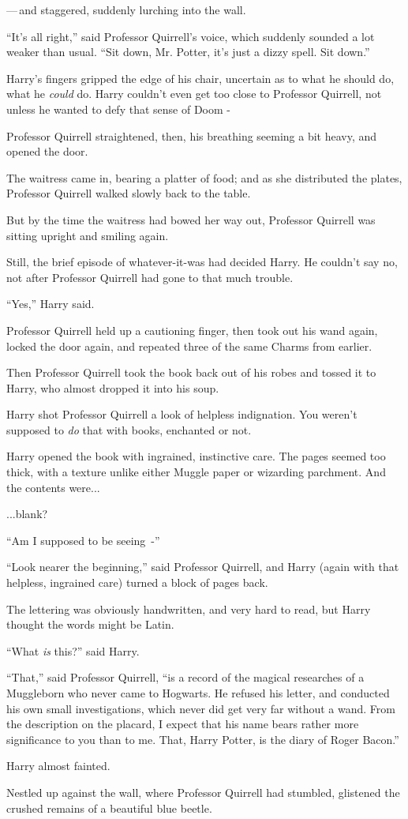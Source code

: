 ---\,and staggered, suddenly lurching into the wall.

``It's all right,'' said Professor Quirrell's voice, which suddenly sounded a lot weaker than usual. ``Sit down, Mr. Potter, it's just a dizzy spell. Sit down.''

Harry's fingers gripped the edge of his chair, uncertain as to what he should do, what he \emph{could} do. Harry couldn't even get too close to Professor Quirrell, not unless he wanted to defy that sense of Doom -

Professor Quirrell straightened, then, his breathing seeming a bit heavy, and opened the door.

The waitress came in, bearing a platter of food; and as she distributed the plates, Professor Quirrell walked slowly back to the table.

But by the time the waitress had bowed her way out, Professor Quirrell was sitting upright and smiling again.

Still, the brief episode of whatever-it-was had decided Harry. He couldn't say no, not after Professor Quirrell had gone to that much trouble.

``Yes,'' Harry said.

Professor Quirrell held up a cautioning finger, then took out his wand again, locked the door again, and repeated three of the same Charms from earlier.

Then Professor Quirrell took the book back out of his robes and tossed it to Harry, who almost dropped it into his soup.

Harry shot Professor Quirrell a look of helpless indignation. You weren't supposed to \emph{do} that with books, enchanted or not.

Harry opened the book with ingrained, instinctive care. The pages seemed too thick, with a texture unlike either Muggle paper or wizarding parchment. And the contents were...

...blank?

``Am I supposed to be seeing~-''

``Look nearer the beginning,'' said Professor Quirrell, and Harry (again with that helpless, ingrained care) turned a block of pages back.

The lettering was obviously handwritten, and very hard to read, but Harry thought the words might be Latin.

``What \emph{is} this?'' said Harry.

``That,'' said Professor Quirrell, ``is a record of the magical researches of a Muggleborn who never came to Hogwarts. He refused his letter, and conducted his own small investigations, which never did get very far without a wand. From the description on the placard, I expect that his name bears rather more significance to you than to me. That, Harry Potter, is the diary of Roger Bacon.''

Harry almost fainted.

Nestled up against the wall, where Professor Quirrell had stumbled, glistened the crushed remains of a beautiful blue beetle.
